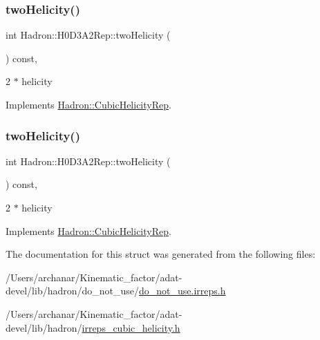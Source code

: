 \subsubsection{\texorpdfstring{twoHelicity()}{twoHelicity()}\hspace{0.1cm}{\footnotesize\ttfamily [2/3]}}
{\footnotesize\ttfamily int Hadron\+::\+H0\+D3\+A2\+Rep\+::two\+Helicity (\begin{DoxyParamCaption}{ }\end{DoxyParamCaption}) const\hspace{0.3cm}{\ttfamily [inline]}, {\ttfamily [virtual]}}

2 $\ast$ helicity 

Implements \mbox{\hyperlink{structHadron_1_1CubicHelicityRep_af507aa56fc2747eacc8cb6c96db31ecc}{Hadron\+::\+Cubic\+Helicity\+Rep}}.

\mbox{\label{structHadron_1_1H0D3A2Rep_a1e84c338f1fbedd7277f543926c976d6}} 
\subsubsection{\texorpdfstring{twoHelicity()}{twoHelicity()}\hspace{0.1cm}{\footnotesize\ttfamily [3/3]}}
{\footnotesize\ttfamily int Hadron\+::\+H0\+D3\+A2\+Rep\+::two\+Helicity (\begin{DoxyParamCaption}{ }\end{DoxyParamCaption}) const\hspace{0.3cm}{\ttfamily [inline]}, {\ttfamily [virtual]}}

2 $\ast$ helicity 

Implements \mbox{\hyperlink{structHadron_1_1CubicHelicityRep_af507aa56fc2747eacc8cb6c96db31ecc}{Hadron\+::\+Cubic\+Helicity\+Rep}}.



The documentation for this struct was generated from the following files\+:\begin{DoxyCompactItemize}
\item 
/\+Users/archanar/\+Kinematic\+\_\+factor/adat-\/devel/lib/hadron/do\+\_\+not\+\_\+use/\mbox{\hyperlink{adat-devel_2lib_2hadron_2do__not__use_2do__not__use_8irreps_8h}{do\+\_\+not\+\_\+use.\+irreps.\+h}}\item 
/\+Users/archanar/\+Kinematic\+\_\+factor/adat-\/devel/lib/hadron/\mbox{\hyperlink{adat-devel_2lib_2hadron_2irreps__cubic__helicity_8h}{irreps\+\_\+cubic\+\_\+helicity.\+h}}\end{DoxyCompactItemize}
